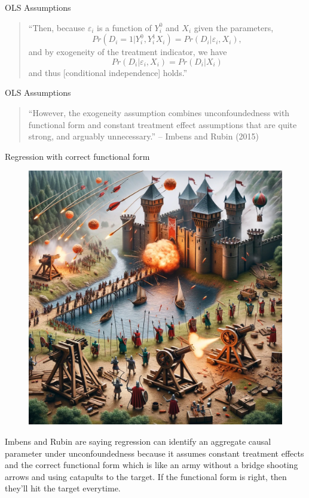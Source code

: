 \documentclass{beamer}
\begin{document}
\begin{frame}{OLS Assumptions}

\begin{quote}
``Then, because $\varepsilon_i$ is a function of $Y^0_i$ and $X_i$ given the parameters, $$Pr(D_i=1 | Y_i^0, Y_i^1 X_i ) = Pr(D_i | \varepsilon_i, X_i),$$ and by exogeneity of the treatment indicator, we have $$Pr(D_i|\varepsilon_i, X_i) = Pr(D_i | X_i)$$ and thus [conditional independence] holds.'' 
\end{quote}

\end{frame}

\begin{frame}{OLS Assumptions}

\begin{quote}
``However, the exogeneity assumption combines unconfoundedness with functional form and constant treatment effect assumptions that are quite strong, and arguably unnecessary.'' -- Imbens and Rubin (2015)
\end{quote}

\end{frame}


\begin{frame}{Regression with correct functional form}

  \begin{figure}
    \includegraphics[scale=0.14]{./lecture_includes/regression_fnform.png}
  \end{figure}
  
Imbens and Rubin are saying regression can identify an aggregate causal parameter under unconfoundedness because it assumes constant treatment effects and the correct functional form which is like an army without a bridge shooting arrows and using catapults to the target.  If the functional form is right, then they'll hit the target everytime.  

\end{frame}
\end{document}
